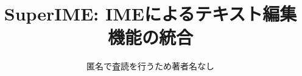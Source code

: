 \documentclass[twoside]{wiss}
\def\system{\textsf{SuperIME\texttrademark}}
\def\papertitle{\system: IMEによるテキスト編集機能の統合}
\begin{document}
\title{\papertitle}
\etitle{} %

\author{匿名で査読を行うため著者名なし
	}



\maketitle













\end{document}
